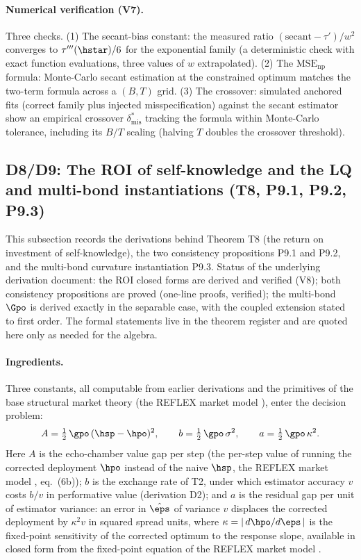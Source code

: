 \paragraph{Numerical verification (V7).}
Three checks. (1) The secant-bias constant: the measured ratio
$(\text{secant} - \tau')/w^2$ converges to $\tau'''(\hstar)/6$ for the
exponential family (a deterministic check with exact function evaluations,
three values of $w$ extrapolated). (2) The $\mathrm{MSE}_{\mathrm{np}}$
formula: Monte-Carlo secant estimation at the constrained optimum matches
the two-term formula across a $(B, T)$ grid. (3) The crossover: simulated
anchored fits (correct family plus injected misspecification) against the
secant estimator show an empirical crossover $\delta_{\mathrm{mis}}^{*}$
tracking the formula within Monte-Carlo tolerance, including its $B/T$
scaling (halving $T$ doubles the crossover threshold).

\subsection*{D8/D9: The ROI of self-knowledge and the LQ and multi-bond instantiations (T8, P9.1, P9.2, P9.3)}

This subsection records the derivations behind Theorem T8 (the return on
investment of self-knowledge), the two consistency propositions P9.1 and
P9.2, and the multi-bond curvature instantiation P9.3. Status of the
underlying derivation document: the ROI closed forms are derived and
verified (V8); both consistency propositions are proved (one-line proofs,
verified); the multi-bond $\Gpo$ is derived exactly in the separable case,
with the coupled extension stated to first order. The formal statements
live in the theorem register and are quoted here only as needed for the
algebra.

\paragraph{Ingredients.}
Three constants, all computable from earlier derivations and the
primitives of the base structural market theory (the REFLEX market model \citep{reflex2026}),
enter the decision problem:
\begin{equation*}
A = \tfrac{1}{2}\,\gpo\,(\hsp - \hpo)^2, \qquad
b = \tfrac{1}{2}\,\gpo\,\sigma^2, \qquad
a = \tfrac{1}{2}\,\gpo\,\kappa^2 .
\end{equation*}
Here $A$ is the echo-chamber value gap per step (the per-step value of
running the corrected deployment $\hpo$ instead of the naive $\hsp$,
the REFLEX market model \citep{reflex2026}, eq.\ (6b)); $b$ is the exchange rate of T2, under
which estimator accuracy $v$ costs $b/v$ in performative value
(derivation D2); and $a$ is the residual gap per unit of estimator
variance: an error in $\hat\eps$ of variance $v$ displaces the corrected
deployment by $\kappa^2 v$ in squared spread units, where
$\kappa = |\,d\hpo/d\eps\,|$ is the fixed-point sensitivity of the
corrected optimum to the response slope, available in closed form from
the fixed-point equation of the REFLEX market model \citep{reflex2026}.


